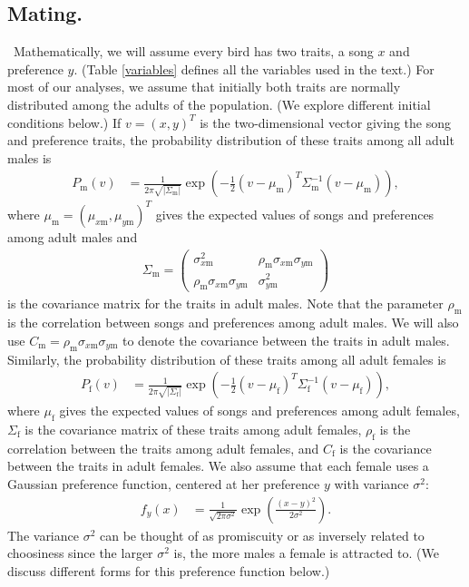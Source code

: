 \documentclass[12pt]{article}
\newcommand{\x}[1]{\text{#1}}
\begin{document}
\subsection*{Mating. }
\ Mathematically, we will assume every bird has two traits, a song $x$ and preference $y$. (Table \ref{variables} defines all the variables used in the text.) For most of our analyses, we assume that initially both traits are normally distributed among the adults of the population. (We explore different initial conditions below.)
If $v=(x,y)^T$ is the two-dimensional vector giving the song and preference traits, the probability distribution of these traits among all adult males is 
\begin{align*}
P_\x{m}(v)&=\frac{1}{2\pi\sqrt{|\Sigma_\x{m}|}}\exp\left(-\frac{1}{2}(v-\mu_\x{m})^T\Sigma_\x{m}^{-1}(v-\mu_\x{m})\right),
\end{align*} where $\mu_\x{m}=(\mu_{x\x{m}},\mu_{y\x{m}})^T$ gives the expected values of songs and preferences among adult males and 
\begin{align*}
\Sigma_{\x{m}}=\left(\begin{array}{cc}\sigma_{x\x{m}}^2 & \rho_\x{m}\sigma_{x\x{m}}\sigma_{y\x{m}} \\ \rho_\x{m}\sigma_{x\x{m}}\sigma_{y\x{m}} & \sigma_{y\x{m}}^2 \end{array}\right)
\end{align*}
is the covariance matrix for the traits in adult males. Note that the parameter $\rho_\x{m}$ is the correlation between songs and preferences among adult males. We will also use $C_\x{m}=\rho_\x{m}\sigma_{x\x{m}}\sigma_{y\x{m}}$ to denote the covariance between the traits in adult males. Similarly, the probability distribution of these traits among all adult females is 
\begin{align*}
P_\x{f}(v)&=\frac{1}{2\pi\sqrt{|\Sigma_\x{f}|}}\exp\left(-\frac{1}{2}(v-\mu_\x{f})^T\Sigma_\x{f}^{-1}(v-\mu_\x{f})\right), 
\end{align*}
where $\mu_\x{f}$ gives the expected values of songs and preferences among adult females,  $\Sigma_\x{f}$ is the covariance matrix of these traits among adult females, $\rho_\x{f}$ is the correlation between the traits among adult females, and $C_\x{f}$ is the covariance between the traits in adult females. 
We also assume that each female uses a Gaussian preference function, centered at her preference $y$ with variance $\sigma^2$:
\begin{align*}
f_y(x)&=\frac{1}{\sqrt{2\pi\sigma^2}}\exp\left(\frac{(x-y)^2}{2\sigma^2}\right).
\end{align*}
The variance $\sigma^2$ can be thought of as promiscuity or as inversely related to choosiness since the larger $\sigma^2$ is, the more males a female is attracted to.  (We  discuss different forms for this preference function below.)
\end{document}
